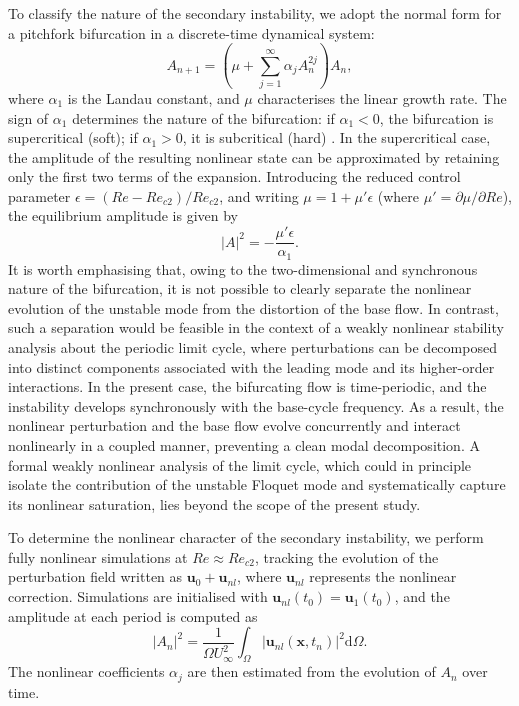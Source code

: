 To classify the nature of the secondary instability, we adopt the normal form for a pitchfork bifurcation in a discrete-time dynamical system:
%
\begin{equation}
A_{n+1} = \left( \mu + \sum_{j=1}^{\infty} \alpha_j A_n^{2j} \right) A_n,
\end{equation}
%
where $\alpha_1$ is the Landau constant, and $\mu$ characterises the linear growth rate. The sign of $\alpha_1$ determines the nature of the bifurcation: if $\alpha_1<0$, the bifurcation is supercritical (soft); if $\alpha_1>0$, it is subcritical (hard) \citep{kuznetsov-1997}. In the supercritical case, the amplitude of the resulting nonlinear state can be approximated by retaining only the first two terms of the expansion. Introducing the reduced control parameter $\epsilon = (Re-Re_{c2})/Re_{c2}$, and writing $\mu = 1 + \mu' \epsilon$ (where $\mu'  = \partial \mu/\partial Re$), the equilibrium amplitude is given by
%
\begin{equation}
|A|^2 = - \frac{\mu' \epsilon}{\alpha_1}.
\end{equation}
%
It is worth emphasising that, owing to the two-dimensional and synchronous nature of the bifurcation, it is not possible to clearly separate the nonlinear evolution of the unstable mode from the distortion of the base flow. In contrast, such a separation would be feasible in the context of a weakly nonlinear stability analysis about the periodic limit cycle, where perturbations can be decomposed into distinct components associated with the leading mode and its higher-order interactions. In the present case, the bifurcating flow is time-periodic, and the instability develops synchronously with the base-cycle frequency. As a result, the nonlinear perturbation and the base flow evolve concurrently and interact nonlinearly in a coupled manner, preventing a clean modal decomposition. A formal weakly nonlinear analysis of the limit cycle, which could in principle isolate the contribution of the unstable Floquet mode and systematically capture its nonlinear saturation, lies beyond the scope of the present study.

To determine the nonlinear character of the secondary instability, we perform fully nonlinear simulations at $Re\approx Re_{c2}$, tracking the evolution of the perturbation field written as $\bm{u}_0 + \bm{u}_{nl}$, where $\bm{u}_{nl}$ represents the nonlinear correction. Simulations are initialised with $\bm{u}_{nl}(t_0) = \bm{u}_1(t_0)$, and the amplitude at each period is computed as
%
\begin{equation}
|A_n|^2 = \frac{1}{\Omega U_\infty^2} \int_\Omega |\bm{u}_{nl}(\bm{x},t_n)|^2 \mathrm{d} \Omega.
\end{equation}
%
The nonlinear coefficients $\alpha_j$ are then estimated from the evolution of $A_n$ over time.

